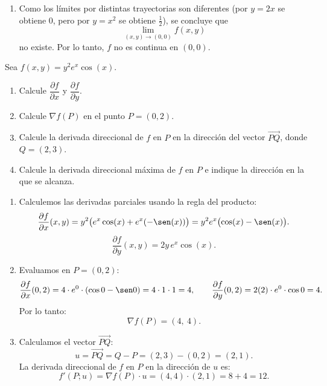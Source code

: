 \documentclass[10pt,a5]{aleph-examen}
\begin{document}
\begin{preguntas}
\begin{respuesta}
\begin{enumerate}
    \item Como los límites por distintas trayectorias son diferentes (por $y=2x$ se obtiene $0$, pero por $y=x^2$ se obtiene $\tfrac{1}{2}$), se concluye que
    \[
        \lim_{(x,y)\to(0,0)} f(x,y)
    \]
    no existe. Por lo tanto, $f$ no es continua en $(0,0)$.\qedhere
\end{enumerate}
\end{respuesta}


\item
Sea $f(x,y)=y^2 e^x\cos(x)$.
\begin{enumerate}[leftmargin=*]
    \item Calcule $\dfrac{\partial f}{\partial x}$ y $\dfrac{\partial f}{\partial y}$.
    \item Calcule $\nabla f(P)$ en el punto $P=(0,2)$.
    \item Calcule la derivada direccional de $f$ en $P$ en la dirección del vector $\overrightarrow{PQ}$, donde $Q=(2,3)$.
    \item Calcule la derivada direccional máxima de $f$ en $P$ e indique la dirección en la que se alcanza.
\end{enumerate}


\begin{respuesta}
\begin{enumerate}
    \item Calculemos las derivadas parciales usando la regla del producto:
    \[
        \frac{\partial f}{\partial x}(x,y)
        =
        y^2\bigl(e^x\cos(x)+e^x(-\sen(x))\bigr)
        =
        y^2 e^x\bigl(\cos(x)-\sen(x)\bigr).
    \]
    \[
        \frac{\partial f}{\partial y}(x,y)
        =
        2y\,e^x\cos(x).
    \]

    \item Evaluamos en $P=(0,2)$:
    \[
        \frac{\partial f}{\partial x}(0,2)
        =
        4\cdot e^0\cdot(\cos 0-\sen 0)
        =
        4\cdot 1\cdot 1
        =
        4,
        \qquad
        \frac{\partial f}{\partial y}(0,2)
        =
        2(2)\cdot e^0\cdot\cos 0
        =
        4.
    \]
    Por lo tanto:
    \[
        \nabla f(P)
        =
        (4,\ 4).
    \]

    \item Calculamos el vector $\overrightarrow{PQ}$:
    \[
        u = \overrightarrow{PQ}
        =
        Q-P
        =
        (2,3)-(0,2)
        =
        (2,1).
    \]
    La derivada direccional de $f$ en $P$ en la dirección de $u$ es:
    \[
        f'(P;u)
        =
        \nabla f(P)\cdot u
        =
        (4,4)\cdot(2,1)
        =
        8+4
        =
        12.
    \]


\end{enumerate}
\end{respuesta}
\end{preguntas}
\end{document}
